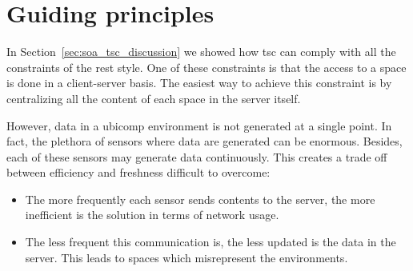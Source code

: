 \section{Guiding principles} %
\label{sec:guiding_principles}

In Section~\ref{sec:soa_tsc_discussion} we showed how \ac{tsc} can comply with all the constraints of the \ac{rest} style.
One of these constraints is that the access to a space is done in a client-server basis.
The easiest way to achieve this constraint is by centralizing all the content of each space in the server itself.


However, data in a \ac{ubicomp} environment is not generated at a single point. %
In fact, the plethora of sensors where data are generated can be enormous. %
Besides, each of these sensors may generate data continuously.
This creates a trade off between efficiency and freshness difficult to overcome:
\begin{itemize}
  \item The more frequently each sensor sends contents to the server, the more inefficient is the solution in terms of network usage.
  \item The less frequent this communication is, the less updated is the data in the server.
        This leads to spaces which misrepresent the environments.
\end{itemize}



